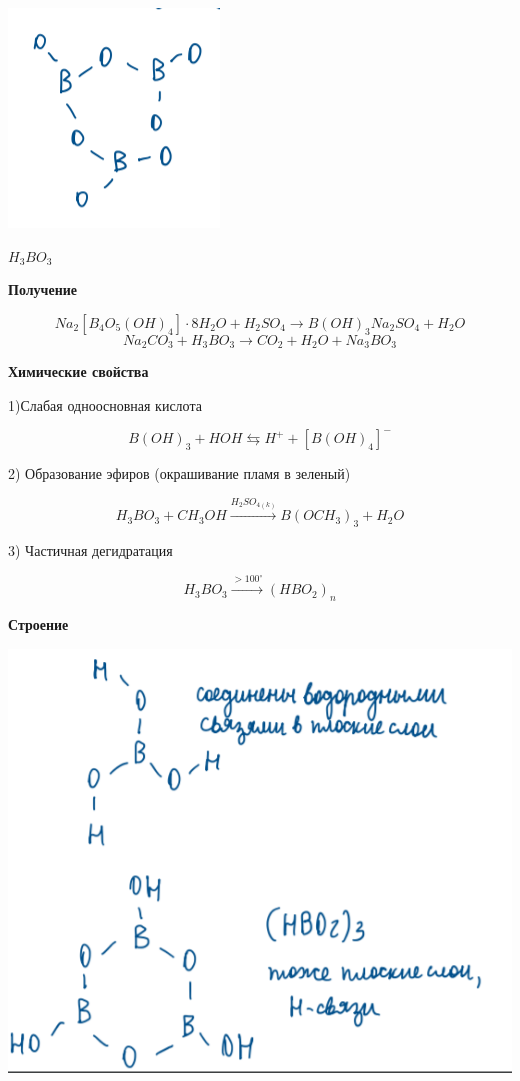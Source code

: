 \includegraphics{images/11v5.png}

$H_3BO_3$

\textbf{Получение}

$$Na_2[B_4O_5(OH)_4]\cdot 8H_2O + H_2SO_4 \rightarrow B(OH)_3 Na_2SO_4 + H_2O$$
$$Na_2CO_3 + H_3BO_3 \rightarrow CO_2 + H_2O + Na_3BO_3$$

\textbf{Химические свойства}

1)Слабая одноосновная кислота

$$B(OH)_3 + HOH \leftrightarrows H^+ + [B(OH)_4]^-$$

2) Образование эфиров (окрашивание пламя в зеленый)

$$H_3BO_3 + CH_3OH \xrightarrow{H_2SO_{4(k)}} B(OCH_3)_3 + H_2O$$

3) Частичная дегидратация

$$H_3BO_3 \xrightarrow{>100^{\circ}} (HBO_2)_n$$

\textbf{Строение}

\includegraphics{images/11v6.png}


